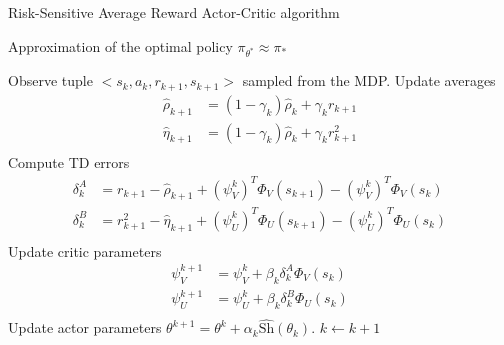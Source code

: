 \begin{algorithm}[t!]
	\caption{Risk-Sensitive Average Reward Actor-Critic algorithm}
	\label{algo:RSARAC}
	\begin{algorithmic}[]
		\Ensure Approximation of the optimal policy $\pi_{\theta^*} \approx \pi_*$
		\begin{algorithmic}[1]
		\Repeat
			\State Observe tuple $<s_k, a_k, r_{k+1}, s_{k+1}>$ sampled from the MDP.
			\State Update averages 
				\begin{equation*}
					\begin{split}
					\widehat{\rho}_{k+1} &= (1 - \gamma_k) \widehat{\rho}_k + 	\gamma_k r_{k+1}\\
					\widehat{\eta}_{k+1} &= (1 - \gamma_k) \widehat{\rho}_k + 	\gamma_k r_{k+1}^2\\
					\end{split}
				\end{equation*}
			\State Compute TD errors	
				\begin{equation*}
					\begin{split}
						\delta_k^A &= r_{k+1} - \widehat{\rho}_{k+1} + (\psi_V^k)^T \Phi_V(s_{k+1}) - (\psi_V^k)^T \Phi_V(s_k)\\
						\delta_k^B &= r_{k+1}^2 - \widehat{\eta}_{k+1} + (\psi_U^k)^T \Phi_U(s_{k+1}) - (\psi_U^k)^T \Phi_U(s_k)\\
					\end{split}
				\end{equation*}
			\State Update critic parameters 
				\begin{equation*}
					\begin{split}
						\psi_V^{k+1} &= \psi_V^k + \beta_k \delta_k^A \Phi_V(s_k)\\
						\psi_U^{k+1} &= \psi_U^k + \beta_k \delta_k^B \Phi_U(s_k)\\
					\end{split}
				\end{equation*}
			\State Update actor parameters $\theta^{k+1} = \theta^k + \alpha_k \widehat{\text{Sh}}(\theta_k) $. 
			\State $k \leftarrow k + 1$
		\end{algorithmic}
	\end{algorithmic}
\end{algorithm}


